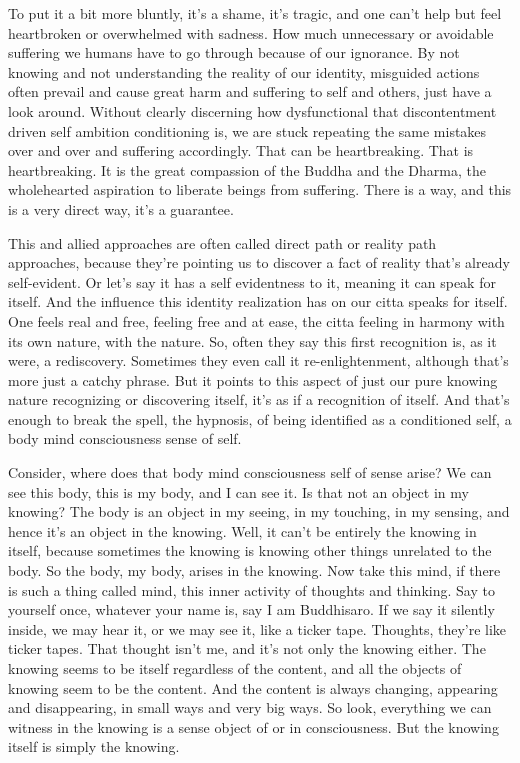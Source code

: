 \documentclass[12pt,openany]{book}
\begin{document}
To put it a bit more bluntly, it’s a shame, it's tragic, and one can't help but feel heartbroken or overwhelmed with sadness. How much unnecessary or avoidable suffering we humans have to go through because of our ignorance. By not knowing and not understanding the reality of our identity, misguided actions often prevail and cause great harm and suffering to self and others, just have a look around. Without clearly discerning how dysfunctional that discontentment driven self ambition conditioning is,  we are stuck repeating the same mistakes over and over and suffering accordingly. That can be heartbreaking. That is heartbreaking. It is the great compassion of the Buddha and the Dharma, the wholehearted aspiration to liberate beings from suffering. There is a way, and this is a very direct way, it's a guarantee.

This and allied approaches are often called direct path or reality path approaches, because they're pointing us to discover a fact of reality that's already self-evident. Or let's say it has a self evidentness to it, meaning it can speak for itself. And the influence this identity realization has on our citta speaks for itself. One feels real and free, feeling free and at ease, the citta feeling in harmony with its own nature, with the nature. So, often they say this first recognition is, as it were, a rediscovery. Sometimes they even call it re-enlightenment, although that's more just a catchy phrase. But it points to this aspect of just our pure knowing nature recognizing or discovering itself, it's as if a recognition of itself. And that's enough to break the spell, the hypnosis, of being identified as a conditioned self, a body mind consciousness sense of self.

Consider, where does that body mind consciousness self of sense arise? We can see this body, this is my body, and I can see it. Is that not an object in my knowing? The body is an object in my seeing, in my touching, in my sensing, and hence it's an object in the knowing. Well, it can't be entirely the knowing in itself, because sometimes the knowing is knowing other things unrelated to the body. So the body, my body, arises in the knowing. Now take this mind, if there is such a thing called mind, this inner activity of thoughts and thinking. Say to yourself once, whatever your name is, say I am Buddhisaro. If we say it silently inside, we may hear it, or we may see it, like a ticker tape. Thoughts, they’re like ticker tapes. That thought isn't me, and it's not only the knowing either. The knowing seems to be itself regardless of the content, and all the objects of knowing seem to be the content. And the content is always changing, appearing and disappearing, in small ways and very big ways. So look, everything we can witness in the knowing is a sense object of or in consciousness. But the knowing itself is simply the knowing.
\end{document}
